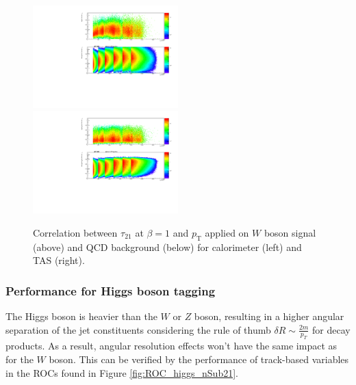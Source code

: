 \begin{figure}[htp]
\includegraphics[width=0.5\textwidth]{sascha_input/plots/W/beta1/scatter_plots/scatter_h_scatter_reco_nSub21.pdf}
\bigskip
\includegraphics[width=0.5\textwidth]{sascha_input/plots/W/beta1/scatter_plots/scatter_h_scatter_assisted_tj_nSub21.pdf} 
\caption{\footnotesize{Correlation between $\tau_{21}$ at $\beta=1$ and $p_{\mathrm{T}}$ applied on $W$ boson signal (above) and QCD background (below) for calorimeter (left) and TAS (right).}}\label{fig:correlation_tau21}
\end{figure}

\subsubsection{Performance for Higgs boson tagging}\label{subsubsec:higgs_beta1}
The Higgs boson is heavier than the $W$ or $Z$ boson, resulting in a higher angular separation of the jet constituents considering the rule of thumb $\delta R \sim \frac{2m}{p_T}$ for decay products. As a result, angular resolution effects won't have the same impact as for the $W$ boson. This can be verified by the performance of track-based variables in the ROCs found in Figure \ref{fig:ROC_higgs_nSub21}.

